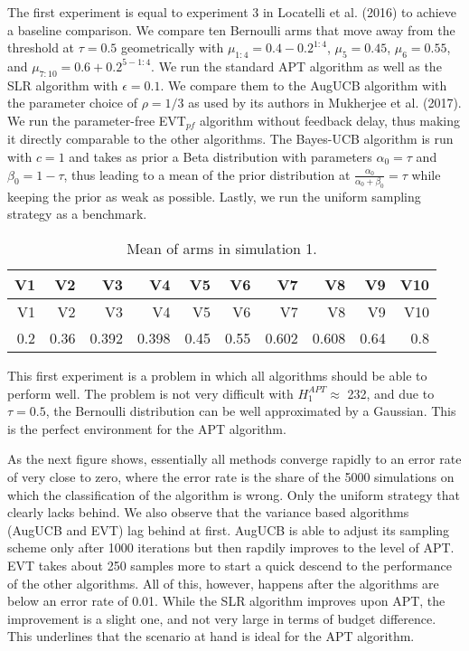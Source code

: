 \documentclass[11pt,]{article}
\begin{document}
The first experiment is equal to experiment 3 in Locatelli et al. (2016)
to achieve a baseline comparison. We compare ten Bernoulli arms that
move away from the threshold at \(\tau = 0.5\) geometrically with
\(\mu_{1:4} = 0.4-0.2^{1:4}\), \(\mu_5 = 0.45\), \(\mu_6 = 0.55\), and
\(\mu_{7:10} = 0.6 + 0.2^{5-1:4}\). We run the standard APT algorithm as
well as the SLR algorithm with \(\epsilon = 0.1\). We compare them to
the AugUCB algorithm with the parameter choice of \(\rho = 1/3\) as used
by its authors in Mukherjee et al. (2017). We run the parameter-free
EVT\(_{pf}\) algorithm without feedback delay, thus making it directly
comparable to the other algorithms. The Bayes-UCB algorithm is run with
\(c=1\) and takes as prior a Beta distribution with parameters
\(\alpha_0 = \tau\) and \(\beta_0 = 1 - \tau\), thus leading to a mean
of the prior distribution at \(\frac{\alpha_0}{\alpha_0+\beta_0}=\tau\)
while keeping the prior as weak as possible. Lastly, we run the uniform
sampling strategy as a benchmark.

\begin{longtable}[]{@{}rrrrrrrrrr@{}}
\caption{Mean of arms in simulation 1.}\tabularnewline
\toprule
V1 & V2 & V3 & V4 & V5 & V6 & V7 & V8 & V9 & V10\tabularnewline
\midrule
\endfirsthead
\toprule
V1 & V2 & V3 & V4 & V5 & V6 & V7 & V8 & V9 & V10\tabularnewline
\midrule
\endhead
0.2 & 0.36 & 0.392 & 0.398 & 0.45 & 0.55 & 0.602 & 0.608 & 0.64 &
0.8\tabularnewline
\bottomrule
\end{longtable}

This first experiment is a problem in which all algorithms should be
able to perform well. The problem is not very difficult with
\(H_1^{APT} \approx\) 232, and due to \(\tau = 0.5\), the Bernoulli
distribution can be well approximated by a Gaussian. This is the perfect
environment for the APT algorithm.

As the next figure shows, essentially all methods converge rapidly to an
error rate of very close to zero, where the error rate is the share of
the 5000 simulations on which the classification of the algorithm is
wrong. Only the uniform strategy that clearly lacks behind. We also
observe that the variance based algorithms (AugUCB and EVT) lag behind
at first. AugUCB is able to adjust its sampling scheme only after 1000
iterations but then rapdily improves to the level of APT. EVT takes
about 250 samples more to start a quick descend to the performance of
the other algorithms. All of this, however, happens after the algorithms
are below an error rate of 0.01. While the SLR algorithm improves upon
APT, the improvement is a slight one, and not very large in terms of
budget difference. This underlines that the scenario at hand is ideal
for the APT algorithm.
\end{document}
